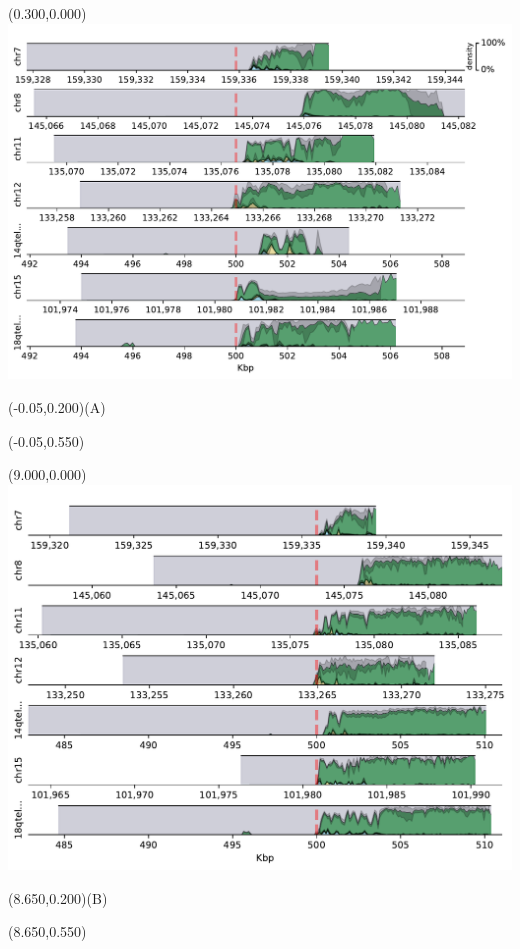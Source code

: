 \documentclass{article}
\begin{document}
\begin{textblock}{13}(0.300,0.000)\includegraphics{Figure_S3/HG001/densityplot-q_arm.pdf}\end{textblock}
\begin{textblock}{13}(-0.05,0.200)\LARGE{(A)}\end{textblock}
\begin{textblock}{13}(-0.05,0.550)\end{textblock}

\begin{textblock}{13}(9.000,0.000)\includegraphics{Figure_S3/HG003/densityplot-q_arm.pdf}\end{textblock}
\begin{textblock}{13}(8.650,0.200)\LARGE{(B)}\end{textblock}
\begin{textblock}{13}(8.650,0.550)\end{textblock}
\end{document}
